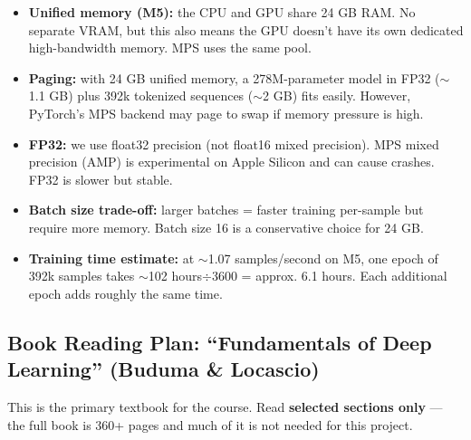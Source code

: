 \begin{itemize}[nosep]
    \item \textbf{Unified memory (M5):} the CPU and GPU share 24 GB RAM. No separate VRAM, but this also means the GPU doesn't have its own dedicated high-bandwidth memory. MPS uses the same pool.
    \item \textbf{Paging:} with 24 GB unified memory, a 278M-parameter model in FP32 ($\sim$1.1 GB) plus 392k tokenized sequences ($\sim$2 GB) fits easily. However, PyTorch's MPS backend may page to swap if memory pressure is high.
    \item \textbf{FP32:} we use float32 precision (not float16 mixed precision). MPS mixed precision (AMP) is experimental on Apple Silicon and can cause crashes. FP32 is slower but stable.
    \item \textbf{Batch size trade-off:} larger batches = faster training per-sample but require more memory. Batch size 16 is a conservative choice for 24 GB.
    \item \textbf{Training time estimate:} at $\sim$1.07 samples/second on M5, one epoch of 392k samples takes $\sim$102 hours$\div$3600 = approx. 6.1 hours. Each additional epoch adds roughly the same time.
\end{itemize}

\subsection{Book Reading Plan: ``Fundamentals of Deep Learning'' (Buduma \& Locascio)}

This is the primary textbook for the course. Read \textbf{selected sections only} --- the full book is 360+ pages and much of it is not needed for this project.


